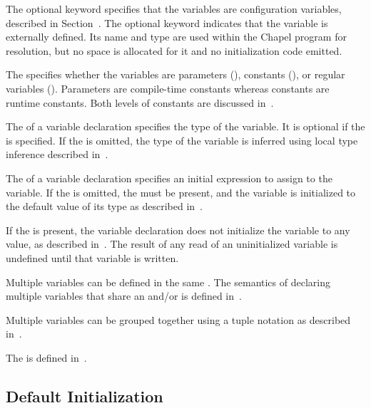 The optional keyword  specifies that the variables are
configuration variables, described in
Section~.  The optional keyword 
indicates that the variable is externally defined.  Its name and type are used
within the Chapel program for resolution, but no space is allocated for it and
no initialization code emitted.

The  specifies whether the variables are
parameters (), constants (), or regular
variables ().  Parameters are compile-time constants whereas
constants are runtime constants.  Both levels of constants are
discussed in~.

The  of a variable declaration specifies the type of
the variable.  It is optional if the  is
specified.  If the  is omitted, the type of the
variable is inferred using local type inference described
in~.

The  of a variable declaration specifies an
initial expression to assign to the variable.  If
the  is omitted, the  must
be present, and the variable is initialized to the default value of
its type as described in~.

If the  is present, the variable
declaration does not initialize the variable to any value, as
described in~. The result of any read of an
uninitialized variable is undefined until that variable is written.

Multiple variables can be defined in the
same .  The semantics of declaring
multiple variables that share an 
and/or  is defined in~.

Multiple variables can be grouped together using a tuple notation as
described in~.

The  is defined
in~.

\subsection{Default Initialization}
\label{Default_Values_For_Types}

